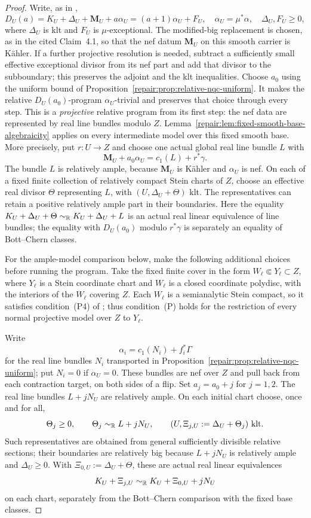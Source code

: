\begin{proof}
Write, as in \cite[Theorem~4.1, Claim~4.1]{HX2026},
\[
 D_U(a)=K_U+\Delta_U+\mathbf M_U+a\alpha_U
     =(a+1)\alpha_U+F_U,
 \quad \alpha_U=\mu^*\alpha,\quad
 \Delta_U,F_U\geq0,
\]
where $\Delta_U$ is klt and $F_U$ is $\mu$-exceptional.
The modified-big replacement is chosen, as in the cited Claim~4.1,
so that the nef datum $\mathbf M_U$ on this smooth carrier is
K\"ahler. If a further projective resolution is needed, subtract a
sufficiently small effective exceptional divisor from its nef part
and add that divisor to the subboundary; this preserves the
adjoint and the klt inequalities.
Choose $a_0$ using the uniform bound of
Proposition~\ref{repair:prop:relative-nqc-uniform}. It makes the relative
$D_U(a_0)$-program $\alpha_U$-trivial and preserves that choice
through every step. This is a
\emph{projective} relative program from its first step: the nef
data are represented by real line bundles modulo $Z$.
Lemma~\ref{repair:lem:fixed-smooth-base-algebraicity} applies on every
intermediate model over this fixed smooth base.
More precisely, put $r:U\to Z$ and choose one actual global real
line bundle $L$ with
\[
 \mathbf M_U+a_0\alpha_U=c_1(L)+r^*\gamma.
\]
The bundle $L$ is relatively ample, because $\mathbf M_U$ is
K\"ahler and $\alpha_U$ is nef. On each of a fixed finite collection
of relatively compact Stein charts of $Z$, choose an effective
real divisor $\Theta$ representing $L$, with $(U,\Delta_U+\Theta)$
klt. The representatives can retain a positive relatively ample
part in their boundaries. Here the equality
$K_U+\Delta_U+\Theta\sim_{\mathbb R}K_U+\Delta_U+L$ is an actual
real linear equivalence of line bundles; the equality with
$D_U(a_0)$ modulo $r^*\gamma$ is separately an equality of
Bott--Chern classes.

For the ample-model comparison below, make the following additional
choices before running the program. Take the fixed finite cover in
the form $W_\ell\Subset Y_\ell\subset Z$, where $Y_\ell$ is a Stein
coordinate chart and $W_\ell$ is a closed coordinate polydisc, with
the interiors of the $W_\ell$ covering $Z$. Each $W_\ell$ is a
semianalytic Stein compact, so it satisfies condition~(P4) of
\cite{Fujino2022}; thus condition~(P) holds for the restriction of every
normal projective model over $Z$ to $Y_\ell$.

Write
\[
 \alpha_i=c_1(N_i)+f_i^*\Gamma
\]
for the real line bundles $N_i$ transported in
Proposition~\ref{repair:prop:relative-nqc-uniform}; put $N_i=0$ if
$\alpha_U=0$. These bundles are nef over $Z$ and pull back from
each contraction target, on both sides of a flip. Set $a_j=a_0+j$
for $j=1,2$. The real line bundles $L+jN_U$ are relatively ample.
On each initial chart choose, once and for all,
\[
 \Theta_j\geq0,\qquad \Theta_j\sim_{\mathbb R}L+jN_U,
 \qquad (U,\Xi_{j,U}:=\Delta_U+\Theta_j)\ \text{klt}.
\]
Such representatives are obtained from general sufficiently
divisible relative sections; their boundaries are relatively big
because $L+jN_U$ is relatively ample and $\Delta_U\geq0$.
With $\Xi_{0,U}:=\Delta_U+\Theta$, these are actual real linear
equivalences
\[
 K_U+\Xi_{j,U}\sim_{\mathbb R}K_U+\Xi_{0,U}+jN_U
\]
on each chart, separately from the Bott--Chern comparison with the
fixed base classes.


\end{proof}
